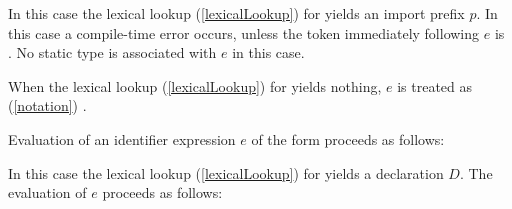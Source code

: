 \documentclass[makeidx]{article}
\begin{document}
{\LMHash{}%
In this case the lexical lookup
(\ref{lexicalLookup})
for \id{} yields an import prefix $p$.
In this case a compile-time error occurs,
unless the token immediately following $e$ is .
No static type is associated with $e$ in this case.

\EndCase

\LMHash{}%
When the lexical lookup
(\ref{lexicalLookup})
for \id{} yields nothing,
$e$ is treated as
(\ref{notation})
.

\EndCase

\LMHash{}%
Evaluation of an identifier expression $e$ of the form \id{}
proceeds as follows:

\LMHash{}%
In this case the lexical lookup
(\ref{lexicalLookup})
for \id{} yields a declaration $D$.
The evaluation of $e$ proceeds as follows:

}
\end{document}
